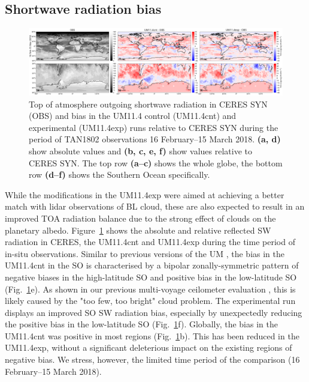 
\subsection{Shortwave radiation bias}
\label{sec:4:sw-bias}

\begin{figure}[t]
\centering
\centerline{\includegraphics[width=1.12\textwidth]{chapter4/fig/sw.png}}
\caption[Top of atmosphere outgoing shortwave radiation]{Top of atmosphere outgoing shortwave radiation in CERES SYN (OBS) and
bias in the UM11.4 control (UM11.4cnt) and experimental (UM11.4exp) runs relative
to CERES SYN during the period of TAN1802 observations 16 February--15 March 2018.
\textbf{(a, d)} show absolute values and \textbf{(b, c, e, f)} show values relative
to CERES SYN. The top row \textbf{(a--c)} shows the whole globe, the bottom
row \textbf{(d--f)} shows the Southern Ocean specifically.
}
\label{fig:4:sw}
\end{figure}

While the modifications in the UM11.4exp were aimed at achieving a better
match with lidar observations of BL cloud, these are also expected to
result in an improved TOA radiation balance due to the strong effect of
clouds on the planetary albedo. Figure~\ref{fig:4:sw} shows the absolute
and relative reflected SW radiation in CERES, the UM11.4cnt and UM11.4exp
during the time period of in-situ observations. Similar to previous
versions of the UM \citep{kuma2020a,schuddeboom2019}, the bias in the UM11.4cnt
in the SO is characterised by a bipolar zonally-symmetric pattern of negative
biases in the high-latitude SO
and positive bias in the low-latitude SO (Fig.~\ref{fig:4:sw}e).
As shown in our previous multi-voyage ceilometer
evaluation \citep{kuma2020a}, this is likely caused by the "too few, too bright"
cloud problem. The experimental run displays an improved SO SW radiation
bias, especially by unexpectedly reducing the positive bias in the low-latitude SO
(Fig.~\ref{fig:4:sw}f). Globally, the bias in the UM11.4cnt was positive in most
regions (Fig.~\ref{fig:4:sw}b). This has been reduced in the UM11.4exp, without
a significant deleterious impact on the existing regions of negative bias. We stress,
however, the limited time period of the comparison (16 February--15 March 2018).

